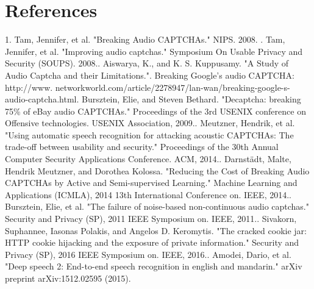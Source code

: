 \section{References}


1. Tam, Jennifer, et al. "Breaking Audio CAPTCHAs." NIPS. 2008. . Tam, Jennifer, et al. "Improving audio captchas." Symposium On Usable Privacy and Security (SOUPS). 2008.. Aiswarya, K., and K. S. Kuppusamy. "A Study of Audio Captcha and their Limitations.". Breaking Google's audio CAPTCHA: http://www.\newline
networkworld.com/article/2278947/lan-wan/breaking-google-s-audio-captcha.html. Bursztein, Elie, and Steven Bethard. "Decaptcha: breaking 75\% of eBay audio CAPTCHAs." Proceedings of the 3rd USENIX conference on Offensive technologies. USENIX Association, 2009.. Meutzner, Hendrik, et al. "Using automatic speech recognition for attacking acoustic CAPTCHAs: The trade-off between usability and security." Proceedings of the 30th Annual Computer Security Applications Conference. ACM, 2014.. Darnstädt, Malte, Hendrik Meutzner, and Dorothea Kolossa. "Reducing the Cost of Breaking Audio CAPTCHAs by Active and Semi-supervised Learning." Machine Learning and Applications (ICMLA), 2014 13th International Conference on. IEEE, 2014.. Bursztein, Elie, et al. "The failure of noise-based non-continuous audio captchas." Security and Privacy (SP), 2011 IEEE Symposium on. IEEE, 2011.. Sivakorn, Suphannee, Iasonas Polakis, and Angelos D. Keromytis. "The cracked cookie jar: HTTP cookie hijacking and the exposure of private information." Security and Privacy (SP), 2016 IEEE Symposium on. IEEE, 2016.. Amodei, Dario, et al. "Deep speech 2: End-to-end speech recognition in english and mandarin." arXiv preprint arXiv:1512.02595 (2015).
